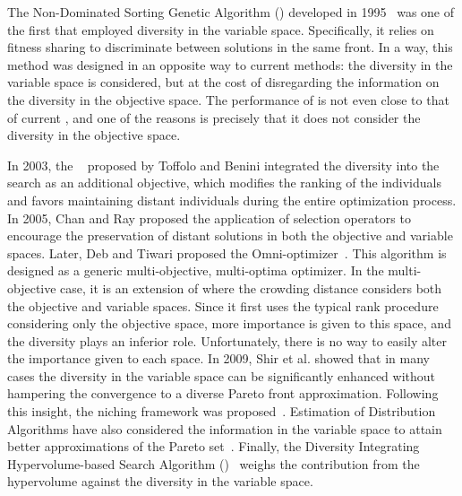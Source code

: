 The Non-Dominated Sorting Genetic Algorithm (\NSGA{}) developed in 1995~\cite{srinivas1994muiltiobjective} 
was one of the first \MOEAS{} that employed diversity in the variable space.
%
Specifically, it relies on fitness sharing to discriminate between solutions in the same front.
%
%
In a way, this method was designed in an opposite way to current methods: the diversity
in the variable space is considered, but at the cost of disregarding the information on the diversity
in the objective space.
%
The performance of \NSGA{} is not even close to that of current \MOEAS{}, and one 
of the reasons is precisely that it does not consider the diversity in the objective space.

In 2003, the \GDEA{}~\cite{toffolo2003genetic} proposed by Toffolo and Benini integrated the diversity into the search 
as an additional objective, which modifies the ranking of the individuals and favors maintaining distant individuals
during the entire optimization process.
%
In 2005, Chan and Ray \cite{chan2005evolutionary} proposed the application of selection operators to
encourage the preservation of distant solutions in both the objective and variable spaces.
%
%
Later, Deb and Tiwari proposed the Omni-optimizer~\cite{deb2008omni}.
%
This algorithm is designed as a generic multi-objective, multi-optima optimizer. %
%
In the multi-objective case, it is an extension of \NSGAII{} where the crowding distance considers both the objective and variable spaces.
%
Since it first uses the typical rank procedure considering only the objective space, more importance is given to this space, 
and the diversity plays an inferior role.
%
Unfortunately, there is no way to easily alter the importance given to each space.
%
In 2009, Shir et al. showed that in many cases the diversity in the variable space can be significantly enhanced without hampering 
the convergence to a diverse Pareto front approximation.
%
Following this insight, the \CMAES{} niching framework was proposed~\cite{shir2009enhancing}.
%
Estimation of Distribution Algorithms have also considered the information in the variable space
to attain better approximations of the Pareto set~\cite{zhou2009approximating}.
%
Finally, the Diversity Integrating Hypervolume-based Search Algorithm (\DIVA{})~\cite{ulrich2010integrating}
weighs the contribution from the hypervolume against the diversity in the variable space.

